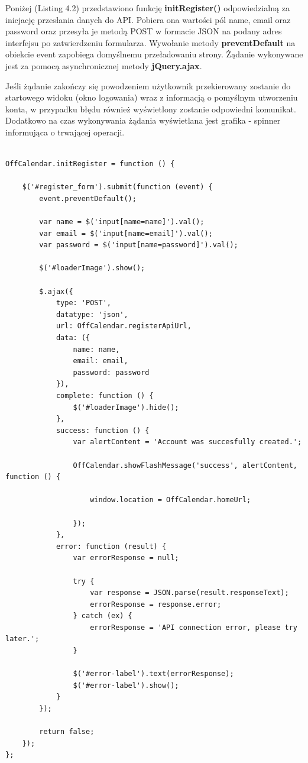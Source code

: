 Poniżej (Listing 4.2) przedstawiono funkcję \textbf{initRegister()} odpowiedzialną za inicjację przesłania danych do API. Pobiera ona wartości pól name, email oraz password oraz przesyła je metodą POST w formacie JSON na podany adres interfejsu po zatwierdzeniu formularza. Wywołanie metody \textbf{preventDefault} na obiekcie event zapobiega domyślnemu przeładowaniu strony. Żądanie wykonywane jest za pomocą asynchronicznej metody \textbf{jQuery.ajax}.

Jeśli żądanie zakończy się powodzeniem użytkownik przekierowany zostanie do startowego widoku (okno logowania) wraz z informacją o pomyślnym utworzeniu konta, w przypadku błędu również wyświetlony zostanie odpowiedni komunikat. Dodatkowo na czas wykonywania żądania wyświetlana jest grafika - spinner informująca o trwającej operacji.

\begin{lstlisting}[caption=Kod metody initRegister odpowiedzialnej za rejestrację użytkownika z wykorzystaniem API., label=amb, captionpos=b]

OffCalendar.initRegister = function () {

    $('#register_form').submit(function (event) {
        event.preventDefault();

        var name = $('input[name=name]').val();
        var email = $('input[name=email]').val();
        var password = $('input[name=password]').val();

        $('#loaderImage').show();

        $.ajax({
            type: 'POST',
            datatype: 'json',
            url: OffCalendar.registerApiUrl,
            data: ({
                name: name,
                email: email,
                password: password
            }),
            complete: function () {
                $('#loaderImage').hide();
            },
            success: function () {
                var alertContent = 'Account was succesfully created.';

                OffCalendar.showFlashMessage('success', alertContent, function () {

                    window.location = OffCalendar.homeUrl;

                });
            },
            error: function (result) {
                var errorResponse = null;

                try {
                    var response = JSON.parse(result.responseText);
                    errorResponse = response.error;
                } catch (ex) {
                    errorResponse = 'API connection error, please try later.';
                }

                $('#error-label').text(errorResponse);
                $('#error-label').show();
            }
        });

        return false;
    });
};

\end{lstlisting}

